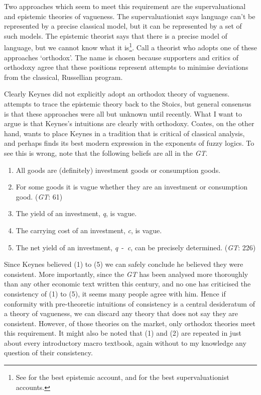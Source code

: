 Two approaches which seem to meet this requirement are the supervaluational and epistemic theories of vagueness. The supervaluationist says language can't be represented by a precise classical model, but it can be represented by a set of such models. The epistemic theorist says that there is a precise model of language, but we cannot know what it is\footnote{See \citet{Williamson1994-WILV} for the best epistemic account, \citet{Fine1975a} and \citet{Keefe2000} for the best supervaluationist accounts.}. Call a theorist who adopts one of these approaches `orthodox'. The name is chosen because supporters and critics of orthodoxy agree that these positions represent attempts to minimise deviations from the classical, Russellian program.

Clearly Keynes did not explicitly adopt an orthodox theory of vagueness. \citet{Williamson1994-WILV} attempts to trace the epistemic theory back to the Stoics, but general consensus is that these approaches were all but unknown until recently. What I want to argue is that Keynes's intuitions are clearly with orthodoxy. Coates, on the other hand, wants to place Keynes in a tradition that is critical of classical analysis, and perhaps finds its best modern expression in the exponents of fuzzy logics. To see this is wrong, note that the following beliefs are all in the \textit{GT}.

\begin{enumerate}
\renewcommand{\labelenumi}{(\arabic{enumi})}
\item All goods are (definitely) investment goods or consumption goods.
\item For some goods it is vague whether they are an investment or consumption good. (\textit{GT}: 61)
\item The yield of an investment, \textit{q}, is vague.
\item The carrying cost of an investment, \textit{c}, is vague.
\item The net yield of an investment, \textit{q}~-~\textit{c}, can be precisely determined. (\textit{GT}: 226)
\end{enumerate}

Since Keynes believed (1) to (5) we can safely conclude he believed they were consistent. More importantly, since the \textit{GT} has been analysed more thoroughly than any other economic text written this century, and no one has criticised the consistency of (1) to (5), it seems many people agree with him. Hence if conformity with pre-theoretic intuitions of consistency is a central desideratum of a theory of vagueness, we can discard any theory that does not say they are consistent. However, of those theories on the market, only orthodox theories meet this requirement. It might also be noted that (1) and (2) are repeated in just about every introductory macro textbook, again without to my knowledge any question of their consistency.


